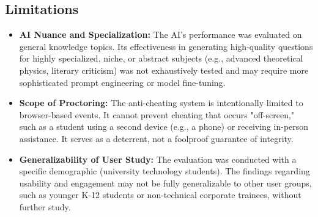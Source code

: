 \subsection{Limitations}
\begin{itemize}
    \item \textbf{AI Nuance and Specialization:} The AI's performance was evaluated on general knowledge topics. Its effectiveness in generating high-quality questions for highly specialized, niche, or abstract subjects (e.g., advanced theoretical physics, literary criticism) was not exhaustively tested and may require more sophisticated prompt engineering or model fine-tuning.
    \item \textbf{Scope of Proctoring:} The anti-cheating system is intentionally limited to browser-based events. It cannot prevent cheating that occurs "off-screen," such as a student using a second device (e.g., a phone) or receiving in-person assistance. It serves as a deterrent, not a foolproof guarantee of integrity.
    \item \textbf{Generalizability of User Study:} The evaluation was conducted with a specific demographic (university technology students). The findings regarding usability and engagement may not be fully generalizable to other user groups, such as younger K-12 students or non-technical corporate trainees, without further study.
\end{itemize}

